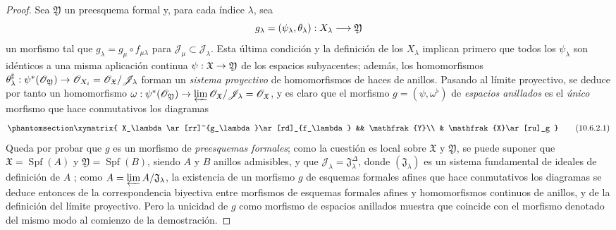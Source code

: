 \documentclass[oneside]{amsart}
\theoremstyle{ega-env-style}
\theoremstyle{ega-thm-env-style}
\theoremstyle{ega-defn-env-style}
\renewcommand{\to}{\mathchoice{\longrightarrow}{\rightarrow}{\rightarrow}{\rightarrow}}
\let\EGAOriginalLabel\label
\renewcommand{\label}[1]{\phantomsection\EGAOriginalLabel{#1}}
\begin{document}
\begin{proof}
Sea $\mathfrak{Y}$ un preesquema formal y, para cada índice $\lambda$, sea
\[
  g_\lambda=(\psi_\lambda,\theta_\lambda):X_\lambda\to\mathfrak{Y}
\]
un morfismo tal que $g_\lambda=g_\mu\circ f_{\mu\lambda}$ para $\mathscr{J}_\mu\subset\mathscr{J}_\lambda$.
Esta última condición y la definición de los $X_\lambda$ implican primero que todos los $\psi_\lambda$ son idénticos a una misma aplicación continua $\psi:\mathfrak{X}\to\mathfrak{Y}$ de los espacios subyacentes; además, los homomorfismos $\theta_\lambda^\sharp:\psi^*(\mathscr{O}_{\mathfrak{Y}})\to
\mathscr{O}_{X_i}=
\mathscr{O}_{\mathfrak{X}}/\mathscr{J}_\lambda$ forman un \emph{sistema proyectivo} de homomorfismos de haces de anillos.
Pasando al límite proyectivo, se deduce por tanto un homomorfismo $\omega:\psi^*(\mathscr{O}_{\mathfrak{Y}})\to
  \varprojlim\mathscr{O}_{\mathfrak{X}}/\mathscr{J}_\lambda
  =\mathscr{O}_{\mathfrak{X}}$, y es claro que el morfismo $g=(\psi,\omega^\flat)$ de \emph{espacios anillados} es el \emph{único} morfismo que hace conmutativos los diagramas
\[
  \label{I.10.6.2.1-fr}
  \xymatrix{
    X_\lambda\ar[rr]^{g_\lambda}\ar[rd]_{f_\lambda} &&
    \mathfrak{Y}\\
    & \mathfrak{X}\ar[ru]_g
  }
  \tag{10.6.2.1}
\]
Queda por probar que $g$ es un morfismo de \emph{preesquemas formales}; como la cuestión es local sobre $\mathfrak{X}$ y $\mathfrak{Y}$, se puede suponer que $\mathfrak{X}=\operatorname{Spf}(A)$ y $\mathfrak{Y}=\operatorname{Spf}(B)$, siendo $A$ y $B$ anillos admisibles, y que $\mathscr{J}_\lambda=\mathfrak{J}_\lambda^{\Delta}$, donde $(\mathfrak{J}_\lambda)$ es un sistema fundamental de ideales de definición de $A$ ; como $A=\varprojlim A/\mathfrak{J}_\lambda$, la existencia de un morfismo $g$ de esquemas formales afines que hace conmutativos los diagramas  se deduce entonces de la correspondencia biyectiva  entre morfismos de esquemas formales afines y homomorfismos continuos de anillos, y de la definición del límite proyectivo.
Pero la unicidad de $g$ como morfismo de espacios anillados muestra que coincide con el morfismo denotado del mismo modo al comienzo de la demostración.
\end{proof}
\end{document}
